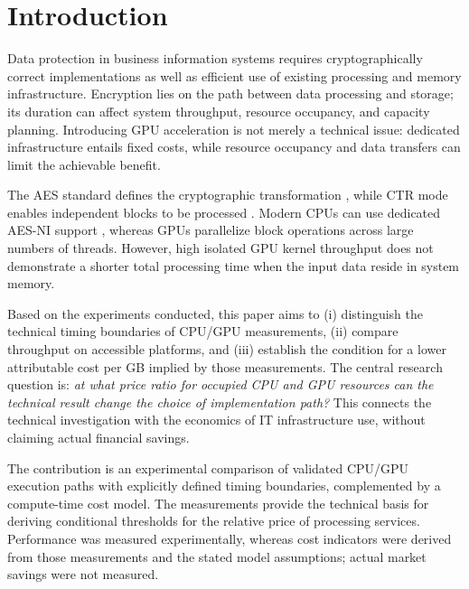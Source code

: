 \documentclass[11pt,b5paper]{article}
\begin{document}
\section{Introduction}
Data protection in business information systems requires cryptographically correct implementations as well as efficient use of existing processing and memory infrastructure. Encryption lies on the path between data processing and storage; its duration can affect system throughput, resource occupancy, and capacity planning. Introducing GPU acceleration is not merely a technical issue: dedicated infrastructure entails fixed costs, while resource occupancy and data transfers can limit the achievable benefit.\par
The AES standard defines the cryptographic transformation \citep{nist_aes2023}, while CTR mode enables independent blocks to be processed \citep{nist_ctr2001}. Modern CPUs can use dedicated AES-NI support \citep{intel_aesni}, whereas GPUs parallelize block operations across large numbers of threads. However, high isolated GPU kernel throughput does not demonstrate a shorter total processing time when the input data reside in system memory.\par
Based on the experiments conducted, this paper aims to (i) distinguish the technical timing boundaries of CPU/GPU measurements, (ii) compare throughput on accessible platforms, and (iii) establish the condition for a lower attributable cost per GB implied by those measurements. The central research question is: \emph{at what price ratio for occupied CPU and GPU resources can the technical result change the choice of implementation path?} This connects the technical investigation with the economics of IT infrastructure use, without claiming actual financial savings.\par
The contribution is an experimental comparison of validated CPU/GPU execution paths with explicitly defined timing boundaries, complemented by a compute-time cost model. The measurements provide the technical basis for deriving conditional thresholds for the relative price of processing services. Performance was measured experimentally, whereas cost indicators were derived from those measurements and the stated model assumptions; actual market savings were not measured.
\end{document}
